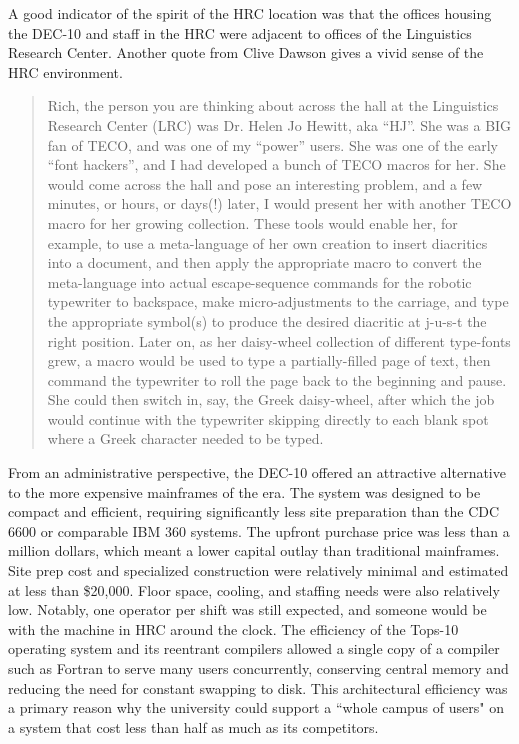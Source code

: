 A good indicator of the spirit of the HRC location was that the offices housing the DEC-10 and staff in the HRC were adjacent to offices of the Linguistics Research Center. Another quote from Clive Dawson gives a vivid sense of the HRC environment.

\begin{quotation}
Rich, the person you are thinking about across the hall at the Linguistics Research Center (LRC) was Dr. Helen Jo Hewitt, aka “HJ”.  She was a BIG fan of TECO, and was one of my “power” users.  She was one of the early “font hackers”, and I had developed a bunch of TECO macros for her.  She would come across the hall and pose an interesting problem, and a few minutes, or hours, or days(!) later, I would present her with another TECO macro for her growing collection. These tools would enable her, for example, to use a meta-language of her own creation to insert diacritics into a document, and then apply the appropriate macro to convert the meta-language into actual escape-sequence commands for the robotic typewriter to backspace, make micro-adjustments to the carriage, and type the appropriate symbol(s) to produce the desired diacritic at j-u-s-t the right position. Later on, as her daisy-wheel collection of different type-fonts grew, a macro would be used to type a partially-filled page of text, then command the typewriter to roll the page back to the beginning and pause. She could then switch in, say, the Greek daisy-wheel, after which the job would continue with the typewriter skipping directly to each blank spot where a Greek character needed to be typed.
\end{quotation}

From an administrative perspective, the DEC-10 offered an attractive alternative to the more expensive mainframes of the era. The system was designed to be compact and efficient, requiring significantly less site preparation than the CDC 6600 or comparable IBM 360 systems. The upfront purchase price was less than a million dollars, which meant a lower capital outlay than traditional mainframes. Site prep cost and specialized construction were relatively minimal and estimated at less than \$20,000. Floor space, cooling, and staffing needs were also relatively low. Notably, one operator per shift was still expected, and someone would be with the machine in HRC around the clock. The efficiency of the Tops-10 operating system and its reentrant compilers allowed a single copy of a compiler such as Fortran to serve many users concurrently, conserving central memory and reducing the need for constant swapping to disk. This architectural efficiency was a primary reason why the university could support a “whole campus of users" on a system that cost less than half as much as its competitors.

